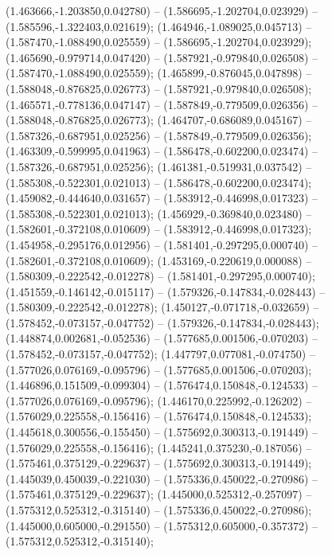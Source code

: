  (1.463666,-1.203850,0.042780) -- (1.586695,-1.202704,0.023929) -- (1.585596,-1.322403,0.021619);
 (1.464946,-1.089025,0.045713) -- (1.587470,-1.088490,0.025559) -- (1.586695,-1.202704,0.023929);
 (1.465690,-0.979714,0.047420) -- (1.587921,-0.979840,0.026508) -- (1.587470,-1.088490,0.025559);
 (1.465899,-0.876045,0.047898) -- (1.588048,-0.876825,0.026773) -- (1.587921,-0.979840,0.026508);
 (1.465571,-0.778136,0.047147) -- (1.587849,-0.779509,0.026356) -- (1.588048,-0.876825,0.026773);
 (1.464707,-0.686089,0.045167) -- (1.587326,-0.687951,0.025256) -- (1.587849,-0.779509,0.026356);
 (1.463309,-0.599995,0.041963) -- (1.586478,-0.602200,0.023474) -- (1.587326,-0.687951,0.025256);
 (1.461381,-0.519931,0.037542) -- (1.585308,-0.522301,0.021013) -- (1.586478,-0.602200,0.023474);
 (1.459082,-0.444640,0.031657) -- (1.583912,-0.446998,0.017323) -- (1.585308,-0.522301,0.021013);
 (1.456929,-0.369840,0.023480) -- (1.582601,-0.372108,0.010609) -- (1.583912,-0.446998,0.017323);
 (1.454958,-0.295176,0.012956) -- (1.581401,-0.297295,0.000740) -- (1.582601,-0.372108,0.010609);
 (1.453169,-0.220619,0.000088) -- (1.580309,-0.222542,-0.012278) -- (1.581401,-0.297295,0.000740);
 (1.451559,-0.146142,-0.015117) -- (1.579326,-0.147834,-0.028443) -- (1.580309,-0.222542,-0.012278);
 (1.450127,-0.071718,-0.032659) -- (1.578452,-0.073157,-0.047752) -- (1.579326,-0.147834,-0.028443);
 (1.448874,0.002681,-0.052536) -- (1.577685,0.001506,-0.070203) -- (1.578452,-0.073157,-0.047752);
 (1.447797,0.077081,-0.074750) -- (1.577026,0.076169,-0.095796) -- (1.577685,0.001506,-0.070203);
 (1.446896,0.151509,-0.099304) -- (1.576474,0.150848,-0.124533) -- (1.577026,0.076169,-0.095796);
 (1.446170,0.225992,-0.126202) -- (1.576029,0.225558,-0.156416) -- (1.576474,0.150848,-0.124533);
 (1.445618,0.300556,-0.155450) -- (1.575692,0.300313,-0.191449) -- (1.576029,0.225558,-0.156416);
 (1.445241,0.375230,-0.187056) -- (1.575461,0.375129,-0.229637) -- (1.575692,0.300313,-0.191449);
 (1.445039,0.450039,-0.221030) -- (1.575336,0.450022,-0.270986) -- (1.575461,0.375129,-0.229637);
 (1.445000,0.525312,-0.257097) -- (1.575312,0.525312,-0.315140) -- (1.575336,0.450022,-0.270986);
 (1.445000,0.605000,-0.291550) -- (1.575312,0.605000,-0.357372) -- (1.575312,0.525312,-0.315140);
